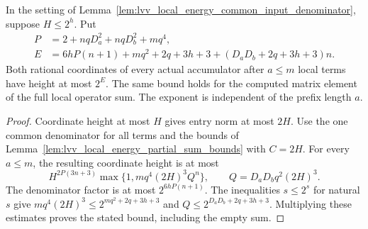 \begin{lemma}
    \label{lem:lvv_local_energy_binary_precision}
    \leanok
    In the setting of
    Lemma~\ref{lem:lvv_local_energy_common_input_denominator}, suppose
    $H\le2^h$. Put
    \begin{align*}
        P & =2+nqD_a^2+nqD_b^2+mq^4, \\
        E & =6hP(n+1)+mq^2+2q+3h+3
        +(D_aD_b+2q+3h+3)n.
    \end{align*}
    Both rational coordinates of every actual accumulator after
    $a\le m$ local terms have height at most $2^E$. The same bound
    holds for the computed matrix element of the full local operator
    sum. The exponent is independent of the prefix length $a$.
\end{lemma}
\begin{proof}\leanok
    Coordinate height at most $H$ gives entry norm at most $2H$.
    Use the one common denominator for all terms and the bounds of
    Lemma~\ref{lem:lvv_local_energy_partial_sum_bounds} with $C=2H$.
    For every $a\le m$, the resulting coordinate height is at most
    \[
        H^{2P(3n+3)}\max\{1,mq^4(2H)^3Q^n\},\qquad
        Q=D_aD_bq^2(2H)^3.
    \]
    The denominator factor is at most $2^{6hP(n+1)}$.
    The inequalities $s\le2^s$ for natural $s$ give
    $mq^4(2H)^3\le2^{mq^2+2q+3h+3}$ and
    $Q\le2^{D_aD_b+2q+3h+3}$. Multiplying these estimates proves
    the stated bound, including the empty sum.
\end{proof}

